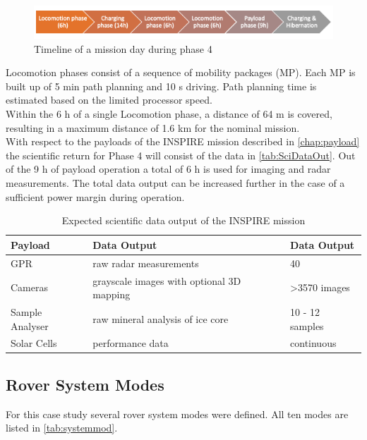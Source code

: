 \begin{figure}[hbt]
  \includegraphics[width=1.0\textwidth]{Media/Timeline_day.png}
  \caption{Timeline of a mission day during phase 4}
  \label{fig:timeline-day}
\end{figure}


Locomotion phases consist of a sequence of mobility packages (MP). Each MP is built up of 5 min path planning and 10 s driving. Path planning time is estimated based on the limited processor speed. \\
Within the 6 h of a single Locomotion phase, a distance of 64 m is covered, resulting in a maximum distance of 1.6 km for the nominal mission.  \\

With respect to the payloads of the INSPIRE mission described in \autoref{chap:payload} the scientific return for Phase 4 will consist of the data in \autoref{tab:SciDataOut}. Out of the 9 h of payload operation a total of 6 h is used for imaging and radar measurements. 
The total data output can be increased further in the case of a sufficient power margin during operation.

\begin{table}[h]
\centering
\caption{Expected scientific data output of the INSPIRE mission }
\begin{tabular}{lll}
Payload         & Data Output                               & Data Output     \\ \hline\hline
GPR             & raw radar measurements                    & 40              \\
Cameras         & grayscale images with optional 3D mapping & >3570 images     \\
Sample Analyser & raw mineral analysis of ice core          & 10 - 12 samples \\
Solar Cells     & performance data                          & continuous      \\ \hline
\end{tabular}
\label{tab:SciDataOut}
\end{table}

  
\subsection{Rover System Modes}
\label{chap:rovsubmod}
For this case study several rover system modes were defined. All ten modes are listed in \autoref{tab:systemmod}. 

